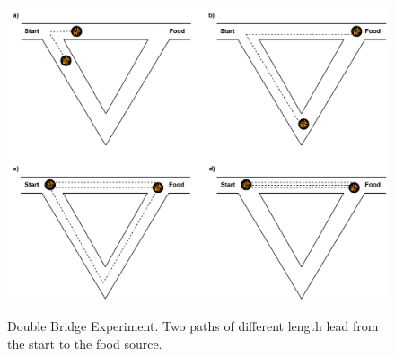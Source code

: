 \begin{figure}[h]
	\begin{centering}
		{\includegraphics[scale=0.8]{figures/background/aco_double_bridge.pdf}}
		\caption[Double Bridge Experiment]{Double Bridge Experiment. Two paths of different length lead from the start to the food source.}
		\label{fig:double_bridge}
	\end{centering}
\end{figure}
